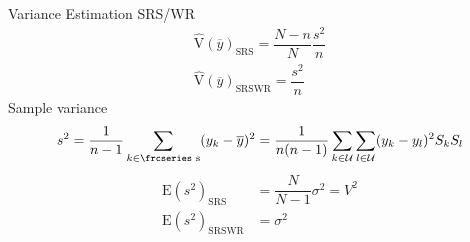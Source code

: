 \documentclass[10pt]{beamer}\usepackage[]{graphicx}\usepackage[]{color}
\newcommand{\textfrc}[1]{{\frcseries#1}}
\newcommand{\mathfrc}[1]{\text{\textfrc{#1}}}
\newcommand{\E}[1]{\text{E}\left(#1\right)}
\newcommand{\V}[1]{\text{V}\left(#1\right)}
\newcommand{\Vest}[1]{\widehat{\text{V}}\left(#1\right)}
\begin{document}
\begin{frame}{Variance Estimation SRS/WR}
\begin{align*}
\Vest{\overline{y}}_{\text{SRS}}   =   \dfrac{N-n}{N} \dfrac{s^2}{n} \\
\Vest{\overline{y}}_{\text{SRSWR}} =  \dfrac{s^2}{n} 
\end{align*}
Sample variance
\begin{equation*}
s^2 = \dfrac{1}{n-1} \sum_{k \in \mathfrc{s}} (y_k - \overline{y})^2 = \dfrac{1}{n(n-1)} \sum_{k \in \mathcal{U}} \sum_{l \in \mathcal{U}} (y_k - y_l)^2 S_k S_l
\end{equation*}
\begin{align*}
\E{s^2}_{\text{SRS}}    &=   \dfrac{N}{N-1} \sigma^2 = V^2 \\
\E{s^2}_{\text{SRSWR}}  &=   \sigma^2
\end{align*}

\end{frame}

\end{document}
